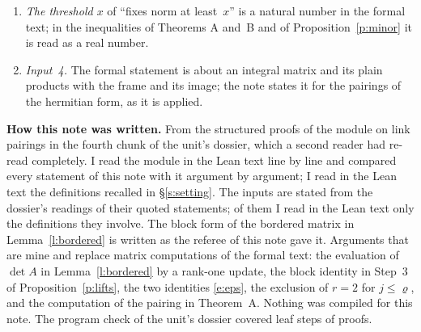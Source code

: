 \documentclass[11pt,a4paper]{article}
\newcommand{\m}[1]{\mbox{$#1$}}        %
\newcommand{\subhead}[1]{\par\addvspace{9pt plus 2pt}\Needspace{4\baselineskip}\noindent\textbf{#1}\enspace\ignorespaces}
\theoremstyle{plainx}
\theoremstyle{uprightx}
\begin{document}
\begin{enumerate}[leftmargin=1.6em,itemsep=3pt]
again for this note: the two divisibilities of Step~4 of Proposition~\ref{p:lifts}. All other steps are proved
in the text from the inputs. In Lemma~\ref{l:bordered} the formal text reorders the rows and columns of the
bordered matrix and verifies its block form entry by entry; the note gives the three lines that this
verification amounts to.
\item \emph{The threshold $x$} of ``fixes norm at least~$x$'' is a natural number in the formal text; in the
inequalities of Theorems A and~B and of Proposition~\ref{p:minor} it is read as a real number.
\item \emph{Input~4.} The formal statement is about an integral matrix and its plain products with the frame
and its image; the note states it for the pairings of the hermitian form, as it is applied.
\end{enumerate}

\subhead{How this note was written.} From the structured proofs of the module on link pairings in the fourth
chunk of the unit's dossier, which a second reader had re-read completely. I read the module in the Lean text
line by line and compared every statement of this note with it argument by argument; I read in the Lean text
the definitions recalled in §\ref{s:setting}. The inputs are stated from the dossier's readings of their quoted
statements; of them I read in the Lean text only the definitions they involve. The block form of the bordered matrix in Lemma~\ref{l:bordered} is
written as the referee of this note gave it. Arguments that are mine and
replace matrix computations of the formal text: the evaluation of \m{\det A} in Lemma~\ref{l:bordered} by a
rank-one update, the block identity in Step~3 of Proposition~\ref{p:lifts}, the two identities \eqref{e:eps},
the exclusion of \m{r=2} for \m{j\le\varrho}, and the computation of the pairing in Theorem~A. Nothing was
compiled for this note. The program check of the unit's dossier covered \UnitSteps{} leaf steps of \UnitProofs{}
proofs.
\end{document}
